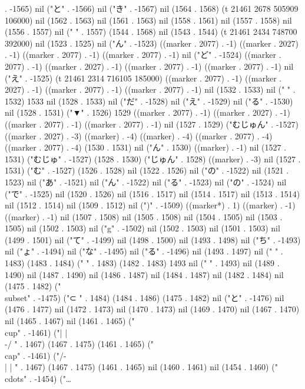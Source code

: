 . -1565) nil ("と" . -1566) nil ("き" . -1567) nil (1564 . 1568) (t 21461 2678 505909 106000) nil (1562 . 1563) nil (1561 . 1563) nil (1558 . 1561) nil (1557 . 1558) nil (1556 . 1557) nil (" " . 1557) (1544 . 1568) nil (1543 . 1544) (t 21461 2434 748700 392000) nil (1523 . 1525) nil ("ん" . -1523) ((marker . 2077) . -1) ((marker . 2027) . -1) ((marker . 2077) . -1) ((marker . 2077) . -1) nil ("ど" . -1524) ((marker . 2077) . -1) ((marker . 2027) . -1) ((marker . 2077) . -1) ((marker . 2077) . -1) nil ("え" . -1525) (t 21461 2314 716105 185000) ((marker . 2077) . -1) ((marker . 2027) . -1) ((marker . 2077) . -1) ((marker . 2077) . -1) nil (1532 . 1533) nil (" " . 1532) 1533 nil (1528 . 1533) nil ("だ" . -1528) nil ("え" . -1529) nil ("る" . -1530) nil (1528 . 1531) ("▼" . 1526) 1529 ((marker . 2077) . -1) ((marker . 2027) . -1) ((marker . 2077) . -1) ((marker . 2077) . -1) nil (1527 . 1529) ("むじゅん" . -1527) ((marker . 2027) . -3) ((marker) . -4) ((marker) . -4) ((marker . 2077) . -4) ((marker . 2077) . -4) (1530 . 1531) nil ("ん" . 1530) ((marker) . -1) nil (1527 . 1531) ("むじゅ" . -1527) (1528 . 1530) ("じゅん" . 1528) ((marker) . -3) nil (1527 . 1531) ("む" . -1527) (1526 . 1528) nil (1522 . 1526) nil ("の" . -1522) nil (1521 . 1523) nil ("あ" . -1521) nil ("ん" . -1522) nil ("る" . -1523) nil ("の" . -1524) nil ("で" . -1525) nil (1520 . 1526) nil (1516 . 1517) nil (1514 . 1517) nil (1513 . 1514) nil (1512 . 1514) nil (1509 . 1512) nil (")" . -1509) ((marker*) . 1) ((marker) . -1) ((marker) . -1) nil (1507 . 1508) nil (1505 . 1508) nil (1504 . 1505) nil (1503 . 1505) nil (1502 . 1503) nil ("g" . -1502) nil (1502 . 1503) nil (1501 . 1503) nil (1499 . 1501) nil ("て" . -1499) nil (1498 . 1500) nil (1493 . 1498) nil ("ち" . -1493) nil ("ょ" . -1494) nil ("な" . -1495) nil ("る" . -1496) nil (1493 . 1497) nil (" " . 1483) (1483 . 1484) (" " . 1483) (1482 . 1483) 1493 nil ("
" . 1493) nil (1489 . 1490) nil (1487 . 1490) nil (1486 . 1487) nil (1484 . 1487) nil (1482 . 1484) nil (1475 . 1482) ("\\subset" . -1475) ("⊂
" . 1484) (1484 . 1486) (1475 . 1482) nil ("と" . -1476) nil (1476 . 1477) nil (1472 . 1473) nil (1470 . 1473) nil (1469 . 1470) nil (1467 . 1470) nil (1465 . 1467) nil (1461 . 1465) ("\\cup" . -1461) ("| |
\\-/
" . 1467) (1467 . 1475) (1461 . 1465) ("\\cap" . -1461) ("/-\\
| |
" . 1467) (1467 . 1475) (1461 . 1465) nil (1460 . 1461) nil (1454 . 1460) ("\\cdots" . -1454) ("…
